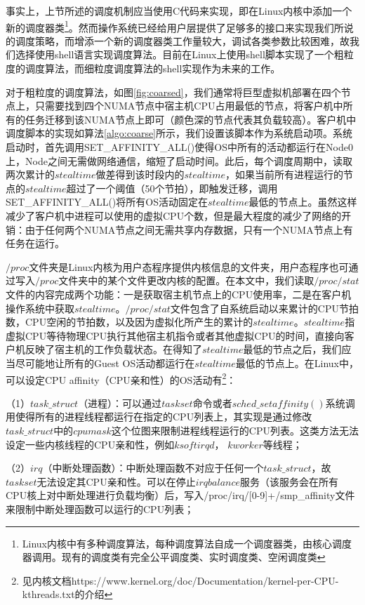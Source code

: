 事实上，上节所述的调度机制应当使用C代码来实现，即在Linux内核中添加一个新的调度器类\footnote{Linux内核中有多种调度算法，每种调度算法自成一个调度器类，由核心调度器调用。现有的调度类有完全公平调度类、实时调度类、空闲调度类}。然而操作系统已经给用户层提供了足够多的接口来实现我们所说的调度策略，而增添一个新的调度器类工作量较大，调试各类参数比较困难，故我们选择使用shell语言实现调度算法。目前在Linux上使用shell脚本实现了一个粗粒度的调度算法，而细粒度调度算法的shell实现作为未来的工作。

对于粗粒度的调度算法，如图\ref{fig:coarsed}，我们通常将巨型虚拟机部署在四个节点上，只需要找到四个NUMA节点中宿主机CPU占用最低的节点，将客户机中所有的任务迁移到该NUMA节点上即可（颜色深的节点代表其负载较高）。客户机中调度脚本的实现如算法\ref{algo:coarse}所示，我们设置该脚本作为系统启动项。系统启动时，首先调用SET\_AFFINITY\_ALL()使得OS中所有的活动都运行在Node0上，Node之间无需做网络通信，缩短了启动时间。此后，每个调度周期中，读取两次累计的$steal time$做差得到该时段内的$steal time$，如果当前所有进程运行的节点的$steal time$超过了一个阈值（50个节拍），即触发迁移，调用SET\_AFFINITY\_ALL()将所有OS活动固定在$steal time$最低的节点上。虽然这样减少了客户机中进程可以使用的虚拟CPU个数，但是最大程度的减少了网络的开销：由于任何两个NUMA节点之间无需共享内存数据，只有一个NUMA节点上有任务在运行。

$/proc$文件夹是Linux内核为用户态程序提供内核信息的文件夹，用户态程序也可通过写入$/proc$文件夹中的某个文件更改内核的配置。在本文中，我们读取$/proc/stat$文件的内容完成两个功能：一是获取宿主机节点上的CPU使用率，二是在客户机操作系统中获取$steal time$。$/proc/stat$文件包含了自系统启动以来累计的CPU节拍数，CPU空闲的节拍数，以及因为虚拟化所产生的累计的$steal time$。$steal time$指虚拟CPU等待物理CPU执行其他宿主机指令或者其他虚拟CPU的时间，直接向客户机反映了宿主机的工作负载状态。在得知了$steal time$最低的节点之后，我们应当尽可能地让所有的Guest OS活动都运行在$steal time$最低的节点上。在Linux中，可以设定CPU affinity（CPU亲和性）的OS活动有\footnote{见内核文档https://www.kernel.org/doc/Documentation/kernel-per-CPU-kthreads.txt的介绍}：

（1）$task\_struct$（进程）：可以通过$taskset$命令或者$sched\_setaffinity()$系统调用使得所有的进程线程都运行在指定的CPU列表上，其实现是通过修改$task\_struct$中的$cpumask$这个位图来限制进程线程运行的CPU列表。这类方法无法设定一些内核线程的CPU亲和性，例如$ksoftirqd$， $kworker$等线程；

（2）$irq$（中断处理函数）：中断处理函数不对应于任何一个$task\_struct$，故$taskset$无法设定其CPU亲和性。可以在停止$irqbalance$服务（该服务会在所有CPU核上对中断处理进行负载均衡）后，写入/proc/irq/[0-9]+/smp\_affinity文件来限制中断处理函数可以运行的CPU列表；

